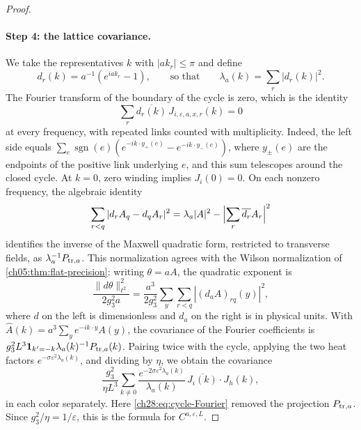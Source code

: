 \begin{proof}
\paragraph{Step 4: the lattice covariance.}
We take the representatives $k$ with $|ak_r|\le\pi$ and define
\[
 d_r(k)=a^{-1}(e^{iak_r}-1),\qquad\text{so that}\qquad \lambda_a(k)=\sum_r|d_r(k)|^2.
\]
The Fourier transform of the boundary of the cycle is zero, which is the identity
\begin{equation}\label{ch28:eq:cycle-Fourier}
 \sum_r\overline{d_r(k)}\,J_{i,\varepsilon,a,x,r}(k)=0
\end{equation}
at every frequency, with repeated links counted with multiplicity. Indeed, the left side equals $\sum_e\operatorname{sgn}(e)(e^{-ik\cdot y_+(e)}-e^{-ik\cdot y_-(e)})$, where $y_\pm(e)$ are the endpoints of the positive link underlying $e$, and this sum telescopes around the closed cycle. At $k=0$, zero winding implies $J_i(0)=0$. On each nonzero frequency, the algebraic identity
\[
 \sum_{r<q}|d_rA_q-d_qA_r|^2=\lambda_a|A|^2-\Bigl|\sum_r\overline{d_r}A_r\Bigr|^2
\]
identifies the inverse of the Maxwell quadratic form, restricted to transverse fields, as $\lambda_a^{-1}P_{{\rm tr},a}$. This normalization agrees with the Wilson normalization of \cref{ch05:thm:flat-precision}: writing $\theta=aA$, the quadratic exponent is
\[
 \frac{\|d\theta\|_{\ell^2}^2}{2g_3^2a}=\frac{a^3}{2g_3^2}\sum_{y}\sum_{r<q}|(d_aA)_{rq}(y)|^2,
\]
where $d$ on the left is dimensionless and $d_a$ on the right is in physical units. With $\widehat A(k)=a^3\sum_ye^{-ik\cdot y}A(y)$, the covariance of the Fourier coefficients is $g_3^2L^3\mathbf 1_{k'=-k}\lambda_a(k)^{-1}P_{{\rm tr},a}(k)$. Pairing twice with the cycle, applying the two heat factors $e^{-\sigma\varepsilon^2\lambda_a(k)}$, and dividing by $\eta$, we obtain the covariance
\[
 \frac{g_3^2}{\eta L^3}\sum_{k\ne0}\frac{e^{-2\sigma\varepsilon^2\lambda_a(k)}}{\lambda_a(k)}\,\overline{J_i(k)}\cdot J_h(k),
\]
in each color separately. Here \eqref{ch28:eq:cycle-Fourier} removed the projection $P_{{\rm tr},a}$. Since $g_3^2/\eta=1/\varepsilon$, this is the formula for $C^{a,\varepsilon,L}$.


\end{proof}
